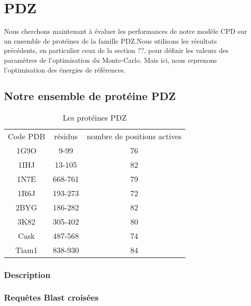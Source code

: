 \chapter{PDZ}
\label{chap:PDZ}

Nous cherchons maintenant à évaluer les performances de notre modèle CPD sur un ensemble de protéines de la famille PDZ.Nous utilisons les résultats précédents, en particulier ceux de la section ??, pour définir les valeurs des paramètres de l'optimisation du Monte-Carlo. Mais ici, nous reprenons l'optimisation des énergies de références.

 
\section{Notre ensemble de protéine PDZ} 
\label{sec:ensemble_PDZ}


    \begin{table}[!htbp]
      \centering

      \begin{tabular}{ccc}

        \toprule
        Code PDB & résidus & nombre de positions actives\\
        \cmidrule{1-3}
        1G9O  & 	9-99	 & 	76	 \\
        1IHJ  & 	13-105	 & 	82	 \\
        1N7E  & 	668-761	 & 	79	 \\
        1R6J  & 	193-273	 & 	72	 \\
        2BYG  & 	186-282	 & 	82	 \\
        3K82  & 	305-402	 & 	80	 \\
        Cask  & 	487-568	 & 	74	 \\
        Tiam1 & 	838-930	 & 	84	 \\
        \bottomrule

      \end{tabular}      
      \caption{Les protéines PDZ}
\label{tab:protéines_PDZ}      
    \end{table}


\subsection{Description}

\subsection{Requêtes Blast croisées}

